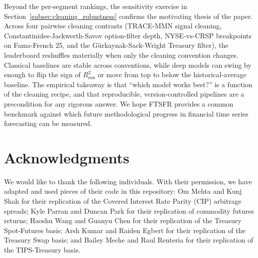 \documentclass{article}
\begin{document}
Beyond the per-segment rankings, the sensitivity exercise in Section~\ref{subsec:cleaning_robustness} confirms the motivating thesis of the paper. Across four pairwise cleaning contrasts (TRACE-MMN signal cleaning, Constantinides-Jackwerth-Savov option-filter depth, NYSE-vs-CRSP breakpoints on Fama-French 25, and the Gürkaynak-Sack-Wright Treasury filter), the leaderboard reshuffles materially when only the cleaning convention changes. Classical baselines are stable across conventions, while deep models can swing by enough to flip the sign of $R^2_{\text{oos}}$ or move from top to below the historical-average baseline. The empirical takeaway is that ``which model works best?'' is a function of the cleaning recipe, and that reproducible, version-controlled pipelines are a precondition for any rigorous answer. We hope FTSFR provides a common benchmark against which future methodological progress in financial time series forecasting can be measured.


\section*{Acknowledgments}

We would like to thank the following individuals. With their permission, we have adapted and used pieces of their code in this repository: Om Mehta and Kunj Shah for their replication of the Covered Interest Rate Parity (CIP) arbitrage spreads; Kyle Parran and Duncan Park for their replication of commodity futures returns; Haoshu Wang and Guanyu Chen for their replication of the Treasury Spot-Futures basis; Arsh Kumar and Raiden Egbert for their replication of the Treasury Swap basis; and Bailey Meche and Raul Renteria for their replication of the TIPS-Treasury basis.





\end{document}
